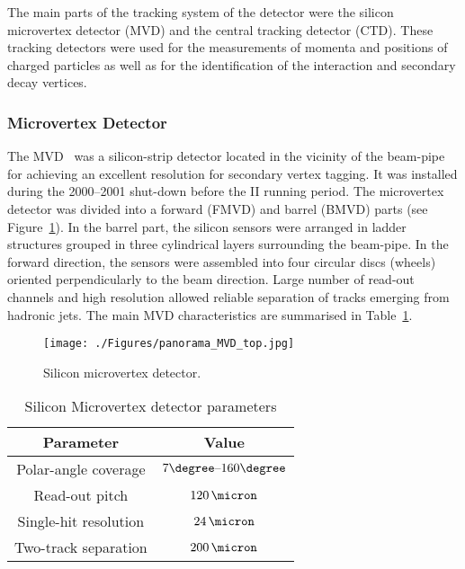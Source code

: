 The main parts of the tracking system of the \zeus detector were the silicon microvertex detector (MVD) and the central tracking detector (CTD). These tracking detectors were used for the measurements of momenta and positions of charged particles as well as for the identification of the interaction and secondary decay vertices.

\subsubsection{Microvertex Detector}
\label{subsubsec:mvd}
The MVD~\cite{nim:a581:656} was a silicon-strip detector located in the vicinity of the beam-pipe for achieving an excellent resolution for secondary vertex tagging. It was installed during the 2000--2001 shut-down before the \hera II running period. The microvertex detector was divided into a forward (FMVD) and barrel (BMVD) parts (see Figure~\ref{fig:MVD_artistic}). In the barrel part, the silicon sensors were arranged in ladder structures grouped in three cylindrical layers surrounding the beam-pipe. In the forward direction, the sensors were assembled into four circular discs (wheels) oriented perpendicularly to the beam direction. Large number of read-out channels and high resolution allowed reliable separation of tracks emerging from hadronic jets. The main MVD characteristics are summarised in Table~\ref{tab:mvdgeomparameters}. 

\begin{figure}[htbp]
	\centering
		\texttt{[image: ./Figures/panorama\_MVD\_top.jpg]}
	\caption{Silicon microvertex detector.}
	\label{fig:MVD_artistic}
\end{figure}

\begin{table}[htbp]
	\centering
\begin{tabular}{ | c | c | }
     \hline
      Parameter & Value \\
			\hline
			\hline
			Polar-angle coverage & $7\degree \mbox{--} 160\degree$ \\ \hline
      Read-out pitch & $120\,\micron$  \\ \hline
			Single-hit resolution & $24\,\micron$ \\ \hline 
			Two-track separation & $200\,\micron$ \\
      \hline
     \end{tabular}
	\caption{Silicon Microvertex detector parameters}
	\label{tab:mvdgeomparameters}
\end{table}

